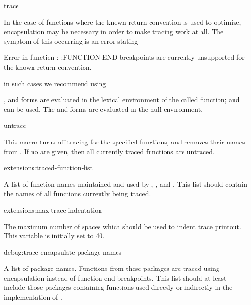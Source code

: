 \begin{defmac}{}{trace}{%
    }
\begin{Lentry}
  \end{Lentry}

  In the case of functions where the known return convention is used
  to optimize, encapsulation may be necessary in order to make
  tracing work at all.  The symptom of this occurring is an error
  stating
  \begin{example}
    Error in function : :FUNCTION-END breakpoints are
    currently unsupported for the known return convention.
  \end{example}
  in such cases we recommend using 
  
    

  
  ,  and  forms are evaluated in
  the lexical environment of the called function;  and
   can be used.  The  and 
  forms are evaluated in the null environment.
\end{defmac}

\begin{defmac}{}{untrace}{ }
  
  This macro turns off tracing for the specified functions, and
  removes their names from .  If no
   are given, then all currently traced functions
  are untraced.
\end{defmac}

\begin{defvar}{extensions:}{traced-function-list}
  
  A list of function names maintained and used by ,
  , and .  This list should contain
  the names of all functions currently being traced.
\end{defvar}

\begin{defvar}{extensions:}{max-trace-indentation}
  
  The maximum number of spaces which should be used to indent trace
  printout.  This variable is initially set to 40.
\end{defvar}

\begin{defvar}{debug:}{trace-encapsulate-package-names}
  
  A list of package names.  Functions from these packages are traced
  using encapsulation instead of function-end breakpoints.  This list
  should at least include those packages containing functions used
  directly or indirectly in the implementation of .
\end{defvar}


